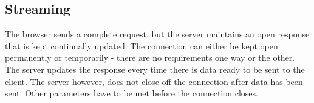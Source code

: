 \subsection{Streaming}


The browser sends a complete request, but the server maintains an open response that is kept continually updated\cite{lubbersgreco}. The connection can either be kept open permanently or temporarily - there are no requirements one way or the other\cite{lubbersgreco}. The server updates the response every time there is data ready to be sent to the client\cite{lubbersgreco}. The server however, does not close off the connection after data has been sent\cite{lubbersgreco}. Other parameters have to be met before the connection closes\cite{lubbersgreco}.